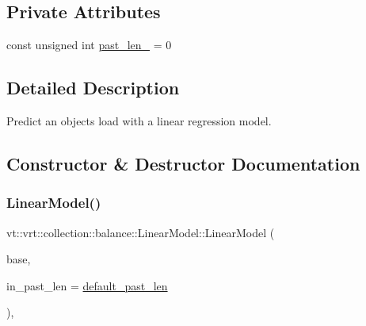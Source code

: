 \subsection*{Private Attributes}
\begin{DoxyCompactItemize}
\item 
const unsigned int \hyperlink{structvt_1_1vrt_1_1collection_1_1balance_1_1_linear_model_ab8225e994dfda4bfc16371cbf58ef578}{past\+\_\+len\+\_\+} = 0
\end{DoxyCompactItemize}


\subsection{Detailed Description}
Predict an object\textquotesingle{}s load with a linear regression model. 

\subsection{Constructor \& Destructor Documentation}
\mbox{\label{structvt_1_1vrt_1_1collection_1_1balance_1_1_linear_model_a90fff488014731417431b35295a263d7}} 
\subsubsection{\texorpdfstring{Linear\+Model()}{LinearModel()}}
{\footnotesize\ttfamily vt\+::vrt\+::collection\+::balance\+::\+Linear\+Model\+::\+Linear\+Model (\begin{DoxyParamCaption}\item[{std\+::shared\+\_\+ptr$<$ \hyperlink{classvt_1_1vrt_1_1collection_1_1balance_1_1_load_model}{balance\+::\+Load\+Model} $>$}]{base,  }\item[{unsigned int}]{in\+\_\+past\+\_\+len = {\ttfamily \hyperlink{structvt_1_1vrt_1_1collection_1_1balance_1_1_linear_model_a5735a20dfd17fb2804a1b9b90d5649d1}{default\+\_\+past\+\_\+len}} }\end{DoxyParamCaption})\hspace{0.3cm}{\ttfamily [inline]}, {\ttfamily [explicit]}}



